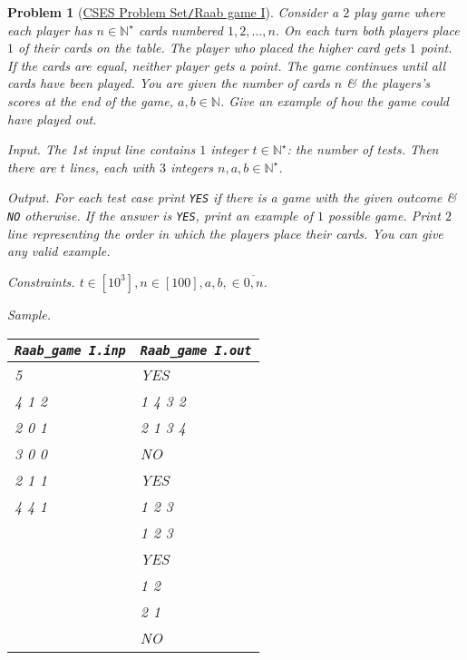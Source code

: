 \documentclass{article}
\newtheorem{problem}{Problem}
\begin{document}
\begin{problem}[\href{https://cses.fi/problemset/task/3399}{CSES Problem Set{\tt/}Raab game I}]
    Consider a $2$ play game where each player has $n\in\mathbb{N}^\star$ cards numbered $1,2,\ldots,n$. On each turn both players place $1$ of their cards on the table. The player who placed the higher card gets $1$ point. If the cards are equal, neither player gets a point. The game continues until all cards have been played. You are given the number of cards $n$ \& the players's scores at the end of the game, $a,b\in\mathbb{N}$. Give an example of how the game could have played out.
    \item {\sf Input.} The 1st input line contains $1$ integer $t\in\mathbb{N}^\star$: the number of tests. Then there are $t$ lines, each with $3$ integers $n,a,b\in\mathbb{N}^\star$.
    \item {\sf Output.} For each test case print {\tt YES} if there is a game with the given outcome \& {\tt NO} otherwise. If the answer is {\tt YES}, print an example of $1$ possible game. Print $2$ line representing the order in which the players place their cards. You can give any valid example.
    \item {\sf Constraints.} $t\in[10^3],n\in[100],a,b,\in\overline{0,n}$.
    \item {\sf Sample.}
    \begin{table}[H]
        \centering
        \begin{tabular}{|l|l|}
            \hline
            \verb|Raab_game I.inp| & \verb|Raab_game I.out| \\
            \hline
            5 & YES \\
            4 1 2 & 1 4 3 2 \\
            2 0 1 & 2 1 3 4 \\
            3 0 0 & NO \\
            2 1 1 & YES \\
            4 4 1 & 1 2 3 \\
            & 1 2 3 \\
            & YES \\
            & 1 2 \\
            & 2 1 \\
            & NO \\
            \hline
        \end{tabular}
    \end{table}
\end{problem}
\end{document}
